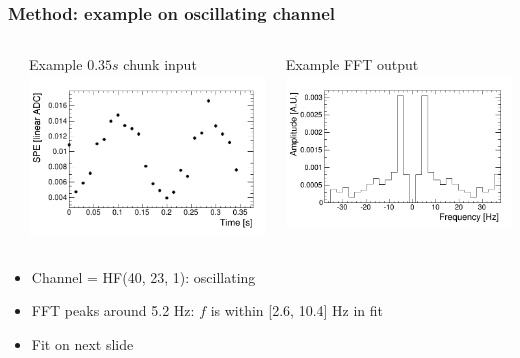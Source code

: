 \documentclass[bigger]{beamer}
\begin{document}
\begin{frame}
\frametitle{Method: example on oscillating channel}
\label{sec-2-1-3}
\begin{columns} %
\label{sec-2-1-3-1}
\begin{column}{0.55\textwidth}
\label{sec-2-1-3-1-1}

\centering
Example $0.35 s$ chunk input
\includegraphics[width=.9\linewidth]{fig/input_graph_ieta40_iphi23_depth1.png}
\end{column}
\begin{column}{0.55\textwidth}
\label{sec-2-1-3-1-2}

\centering
Example FFT output
\includegraphics[width=.9\linewidth]{fig/fft_output_ieta40_iphi23_depth1.png}
\end{column}
\end{columns}
\begin{itemize}

\item Channel = HF(40, 23, 1): oscillating
\label{sec-2-1-3-2}%

\item FFT peaks around 5.2 Hz: $f$ is within [2.6, 10.4] Hz in fit
\label{sec-2-1-3-3}%

\item Fit on next slide
\label{sec-2-1-3-4}%
\end{itemize} %
\end{frame}
\end{document}
